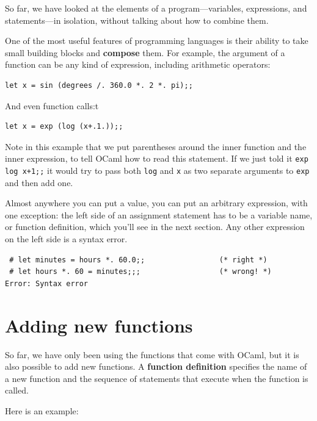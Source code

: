 \documentclass[10pt]{book}
\begin{document}
So far, we have looked at the elements of a program---variables,
expressions, and statements---in isolation, without talking about how to
combine them.

One of the most useful features of programming languages is their
ability to take small building blocks and {\bf compose} them.  For
example, the argument of a function can be any kind of expression,
including arithmetic operators:

\beforeverb
\begin{verbatim}
let x = sin (degrees /. 360.0 *. 2 *. pi);;
\end{verbatim}
\afterverb
%
And even function calls:t

\beforeverb
\begin{verbatim}
let x = exp (log (x+.1.));;
\end{verbatim}
\afterverb
%
Note in this example that we put parentheses around the inner function and the inner 
expression, to tell OCaml how to read this statement. If we just told it \verb"exp log x+1;;" it would try to pass both {\tt log} and {\tt x} as two separate arguments 
to {\tt exp} and then add one.

Almost anywhere you can put a value, you can put an arbitrary
expression, with one exception: the left side of an assignment
statement has to be a variable name, or function definition, which
you'll see in the next section.  Any other expression on the left
side is a syntax error.

\beforeverb
\begin{verbatim}
 # let minutes = hours *. 60.0;;                 (* right *)
 # let hours *. 60 = minutes;;;                  (* wrong! *)
Error: Syntax error
\end{verbatim}
\afterverb
%


\section{Adding new functions}

So far, we have only been using the functions that come with OCaml,
but it is also possible to add new functions.
A {\bf function definition} specifies the name of a new function and
the sequence of statements that execute when the function is called.


Here is an example:
\end{document}
